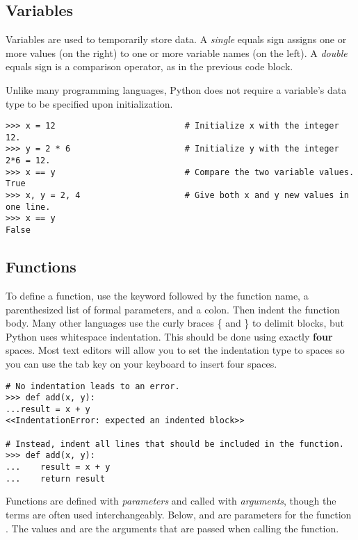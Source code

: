 \subsection*{Variables} %
Variables are used to temporarily store data.
A \emph{single} equals sign assigns one or more values (on the right) to one or more variable names (on the left).
A \emph{double} equals sign is a comparison operator, as in the previous code block.

Unlike many programming languages, Python does not require a variable's data type to be specified upon initialization.

\begin{lstlisting}
>>> x = 12                          # Initialize x with the integer 12.
>>> y = 2 * 6                       # Initialize y with the integer 2*6 = 12.
>>> x == y                          # Compare the two variable values.
True
>>> x, y = 2, 4                     # Give both x and y new values in one line.
>>> x == y
False
\end{lstlisting}

\subsection*{Functions} %

To define a function, use the  keyword followed by the function name, a parenthesized list of formal parameters, and a colon.
Then indent the function body.
Many other languages use the curly braces \{ and \} to delimit blocks, but Python uses whitespace indentation.
This should be done using exactly \textbf{four} spaces.
Most text editors will allow you to set the indentation type to spaces so you can use the tab key on your keyboard to insert four spaces.

\begin{lstlisting}
# No indentation leads to an error.
>>> def add(x, y):
...result = x + y
<<IndentationError: expected an indented block>>

# Instead, indent all lines that should be included in the function.
>>> def add(x, y):
...    result = x + y
...    return result
\end{lstlisting}

Functions are defined with \emph{parameters} and called with \emph{arguments}, though the terms are often used interchangeably.
Below,  and  are parameters for the function .
The values  and  are the arguments that are passed when calling the function.

